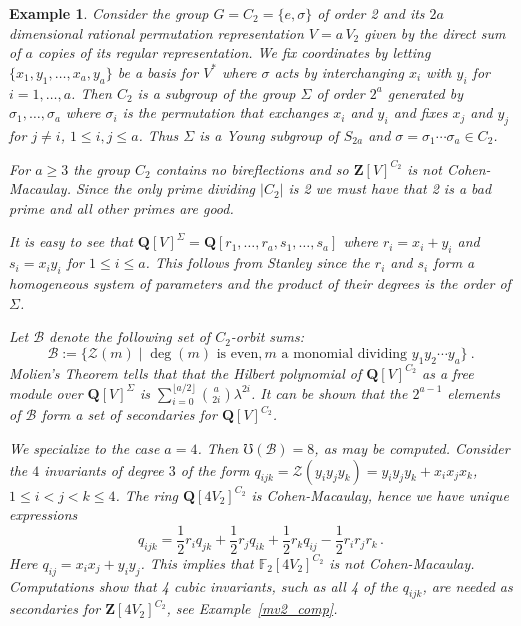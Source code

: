 \documentclass[12pt]{amsart}
\providecommand{\binom}[2]{{#1\choose#2}}
\renewcommand{\geq}{\geqslant}
\newcommand{\QQ}{\mathbf{Q}} %
\newcommand{\ZZ}{\mathbf{Z}} %
\newcommand{\QQ}{\mathbb{Q}} %
\newcommand{\ZZ}{\mathbb{Z}} %
\newtheorem{example}[thm]{Example}
\theoremstyle{definition}
\newcommand{\calb}{\mathcal{B}}
\newcommand{\calz}{\mathcal{Z}}
\begin{document}
\begin{example}\label{ex: mV2}
Consider the group $G=C_2=\{e,\sigma\}$ of order 2 and its $2a$ dimensional rational permutation representation $V=a\, V_2$ given by the direct sum of $a$ copies of its regular representation.  We fix coordinates by letting $\{x_1,y_1,\dots,x_a,y_a\}$ be a basis for $V^*$ where $\sigma$ acts by interchanging $x_i$ with $y_i$ for $i=1,\dots,a$.  Then ${C_2}$ is a subgroup of the  group $\Sigma$ of order $2^a$ generated by $\sigma_1,\dots,\sigma_a$ where $\sigma_i$ is the permutation that exchanges $x_i$ and $y_i$ and fixes $x_j$ and $y_j$ for $j\ne i$, $1 \le i,j \le a$.  Thus $\Sigma$ is a Young subgroup of $S_{2a}$ and $\sigma = \sigma_1 \cdots \sigma_a \in {C_2}$.  

For $a \geq 3$ the group ${C_2}$ contains no bireflections and so $\ZZ[V]^{C_2}$ is not Cohen-Macaulay.  Since the only prime dividing $|{C_2}|$ is 2 we must have that 2 is a bad prime and all other primes are good.

It is easy to see that $\QQ[V]^\Sigma = \QQ[r_1,\dots,r_a,s_1,\dots,s_a]$ where  $r_i = x_i + y_i$ and $s_i = x_i y_i$ for $1 \le i \le a$.  This follows from Stanley 
\cite[Corollary 4.4]{bible} since the $r_i$ and $s_i$ form a homogeneous system of parameters and the product of their degrees is the order of $\Sigma$.


Let $\calb$ denote the following set of ${C_2}$-orbit sums:
$$\calb := \{\calz(m) \mid \deg(m) \text{ is even}, m \text{ a monomial dividing }y_1 y_2 \cdots y_a\}\ .$$
Molien's Theorem tells that that the Hilbert polynomial of $\QQ[V]^{C_2}$ as a free module over $\QQ[V]^\Sigma$ is $\sum_{i=0}^{\lfloor a/2 \rfloor}\binom{a}{2i}\lambda^{2i}$.
It can be shown that the $2^{a-1}$ elements of $\calb$ 
form a set of secondaries for $\QQ[V]^{C_2}$.  


We specialize to the case $a=4$.  Then $\mho(\calb)=8$,
as may be computed.  
Consider the $4$ invariants of degree $3$ of the form $q_{ijk}=\calz(y_iy_jy_k)=y_iy_jy_k+x_ix_jx_k$, $1\le i < j <k \le 4$.  
The ring $\QQ[4V_2]^{C_2}$ is Cohen-Macaulay, hence we have unique expressions
$$
q_{ijk} = \frac{1}{2}r_iq_{jk} + \frac{1}{2}r_jq_{ik} + \frac{1}{2}r_kq_{ij} - \frac{1}{2}r_ir_jr_k\, .
$$
Here $q_{ij}=x_ix_j+y_iy_j$. This implies that $\mathbb{F}_2[4V_2]^{C_2}$ is not Cohen-Macaulay. 
Computations show that 4 cubic invariants, such as all 4 of the $q_{ijk}$, are needed as secondaries for $\ZZ[4V_2]^{C_2}$, see Example~\ref{mv2_comp}.   
 \end{example}
 
\end{document}
